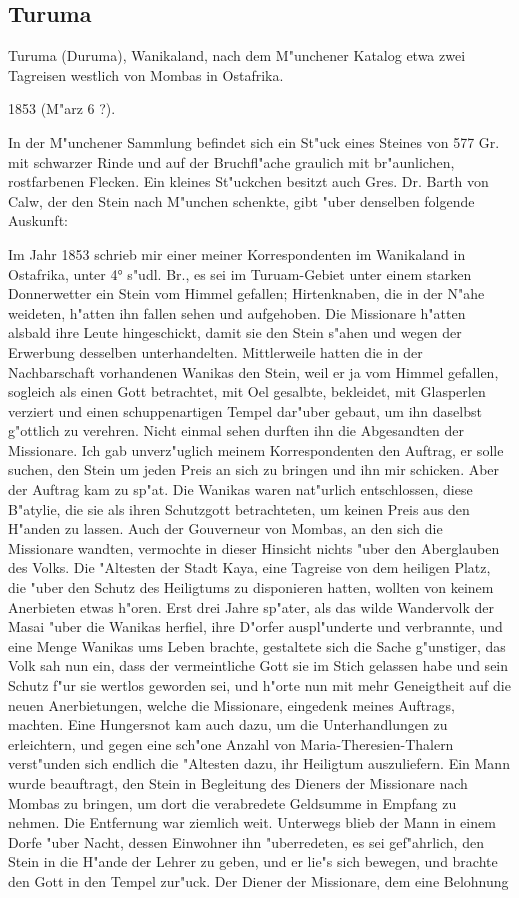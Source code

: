 \documentclass[a4paper, 11pt, oneside]{article}
\begin{document}
\subsection{Turuma}

Turuma (Duruma), Wanikaland, nach dem M"unchener Katalog etwa zwei Tagreisen westlich von Mombas in Ostafrika.

1853 (M"arz 6 ?).

In der M"unchener Sammlung befindet sich ein St"uck eines Steines von 577 Gr. mit schwarzer Rinde und auf der Bruchfl"ache graulich mit br"aunlichen, rostfarbenen Flecken. Ein kleines St"uckchen besitzt auch Gres. Dr. Barth von Calw, der den Stein nach M"unchen schenkte, gibt "uber denselben folgende Auskunft:

Im Jahr 1853 schrieb mir einer meiner Korrespondenten im Wanikaland in Ostafrika, unter 4° s"udl. Br., es sei im Turuam-Gebiet unter einem starken Donnerwetter ein Stein vom Himmel gefallen; Hirtenknaben, die in der N"ahe weideten, h"atten ihn fallen sehen und aufgehoben. Die Missionare h"atten alsbald ihre Leute hingeschickt, damit sie den Stein s"ahen und wegen der Erwerbung desselben unterhandelten. Mittlerweile hatten die in der Nachbarschaft vorhandenen Wanikas den Stein, weil er ja vom Himmel gefallen, sogleich als einen Gott betrachtet, mit Oel gesalbte, bekleidet, mit Glasperlen verziert und einen schuppenartigen Tempel dar"uber gebaut, um ihn daselbst g"ottlich zu verehren. Nicht einmal sehen durften ihn die Abgesandten der Missionare. Ich gab unverz"uglich meinem Korrespondenten den Auftrag, er solle suchen, den Stein um jeden Preis an sich zu bringen und ihn mir schicken. Aber der Auftrag kam zu sp"at. Die Wanikas waren nat"urlich entschlossen, diese B"atylie, die sie als ihren Schutzgott betrachteten, um keinen Preis aus den H"anden zu lassen. Auch der Gouverneur von Mombas, an den sich die Missionare wandten, vermochte in dieser Hinsicht nichts "uber den Aberglauben des Volks. Die "Altesten der Stadt Kaya, eine Tagreise von dem heiligen Platz, die "uber den Schutz des Heiligtums zu disponieren hatten, wollten von keinem Anerbieten etwas h"oren. Erst drei Jahre sp"ater, als das wilde Wandervolk der Masai "uber die Wanikas herfiel, ihre D"orfer auspl"underte und verbrannte, und eine Menge Wanikas ums Leben brachte, gestaltete sich die Sache g"unstiger, das Volk sah nun ein, dass der vermeintliche Gott sie im Stich gelassen habe und sein Schutz f"ur sie wertlos geworden sei, und h"orte nun mit mehr Geneigtheit auf die neuen Anerbietungen, welche die Missionare, eingedenk meines Auftrags, machten. Eine Hungersnot kam auch dazu, um die Unterhandlungen zu erleichtern, und gegen eine sch"one Anzahl von Maria-Theresien-Thalern verst"unden sich endlich die "Altesten dazu, ihr Heiligtum auszuliefern. Ein Mann wurde beauftragt, den Stein in Begleitung des Dieners der Missionare nach Mombas zu bringen, um dort die verabredete Geldsumme in Empfang zu nehmen. Die Entfernung war ziemlich weit. Unterwegs blieb der Mann in einem Dorfe "uber Nacht, dessen Einwohner ihn "uberredeten, es sei gef"ahrlich, den Stein in die H"ande der Lehrer zu geben, und er lie"s sich bewegen, und brachte den Gott in den Tempel zur"uck. Der Diener der Missionare, dem eine Belohnung 
\end{document}
